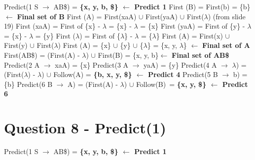 \documentclass{article}
\begin{document}
\begin{multicols}{2}
\setlength{\leftskip}{-12em}
\hspace{-.5cm}Predict(1 S $\rightarrow$ AB\$) = \textbf{\{x, y, b, \$\} $\leftarrow$ Predict 1}\newline
\indent\hspace{.25cm}First (B) = First(b) = \{b\} $\leftarrow$ \textbf{Final set of B}\newline
\indent\hspace{.25cm}First (A) = First(xaA) $\cup$  First(yaA) $\cup$  First($\lambda$) (from slide 19)\newline
\indent\hspace{1cm}First (xaA) = First of \{x\} - $\lambda$ = \{x\} - $\lambda$ = \{x\}\newline
\indent\hspace{1cm}First (yaA) = First of \{y\} - $\lambda$ = \{x\} - $\lambda$ = \{y\}\newline
\indent\hspace{1cm}First ($\lambda$) = First of \{$\lambda$\} - $\lambda$ = \{$\lambda$\}\newline
\indent\hspace{1cm}First (A) = First(x) $\cup$  First(y) $\cup$  First($\lambda$)\newline
\indent\hspace{1cm}First (A) = \{x\} $\cup$ \{y\} $\cup$  \{$\lambda$\} = \{x, y, $\lambda$\} $\leftarrow$ \textbf{Final set of A}\newline
\indent\hspace{.25cm}First(AB\$) = (First(A) - $\lambda$) $\cup$ First(B) = \{x, y, b\}$\leftarrow$ \textbf{Final set of AB\$} \newline
Predict(2 A $\rightarrow$ xaA) = \{x\}\newline
Predict(3 A $\rightarrow$ yaA) = \{y\}\newline
Predict(4 A $\rightarrow$ $\lambda$) = (First($\lambda$) - $\lambda$) $\cup$ Follow(A)\newline
\indent\hspace{2.3cm}= \textbf{\{b, x, y, \$\} $\leftarrow$ Predict 4}\newline
Predict(5 B $\rightarrow$ b) = \{b\}\newline
Predict(6 B $\rightarrow$ A) = (First(A) - $\lambda$) $\cup$ Follow(B)\ = \textbf{\{x, y, \$\} $\leftarrow$ Predict 6}
\end{multicols}
\section*{Question 8 - Predict(1)}
\vspace{-1em}
\hspace{-.3cm}Predict(1 S $\rightarrow$ AB\$) = \textbf{\{x, y, b, \$\} $\leftarrow$ Predict 1}
\end{document}
